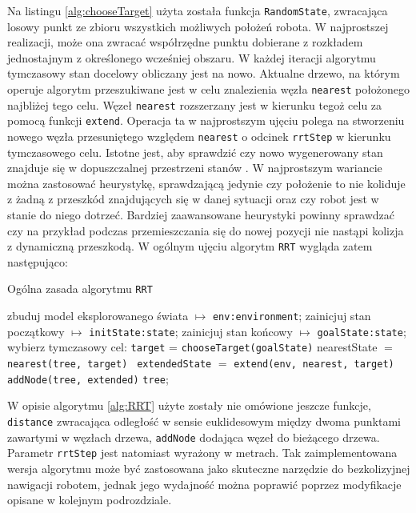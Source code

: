 Na listingu \ref{alg:chooseTarget} użyta została funkcja \texttt{RandomState}, zwracająca losowy punkt ze zbioru wszystkich możliwych położeń robota.
W najprostszej realizacji, może ona zwracać współrzędne punktu dobierane z rozkładem jednostajnym z określonego wcześniej obszaru.
W każdej iteracji algorytmu tymczasowy stan docelowy obliczany jest na nowo. Aktualne drzewo, na którym operuje algorytm przeszukiwane jest w celu znalezienia
węzła \texttt{nearest} położonego najbliżej tego celu. Węzeł \texttt{nearest} rozszerzany jest w kierunku tegoż celu za pomocą funkcji \texttt{extend}.
Operacja ta w najprostszym ujęciu polega na stworzeniu nowego węzła przesuniętego względem \texttt{nearest} o odcinek \texttt{rrtStep} w kierunku tymczasowego celu.
Istotne jest, aby sprawdzić czy nowo wygenerowany stan znajduje się w dopuszczalnej przestrzeni stanów \textdollar. W najprostszym wariancie można zastosować
heurystykę, sprawdzającą jedynie czy położenie to nie koliduje z żadną z przeszkód znajdujących się w danej sytuacji oraz czy robot jest w stanie do niego dotrzeć.
Bardziej zaawansowane heurystyki powinny sprawdzać czy na przykład podczas przemieszczania  się do nowej pozycji nie nastąpi kolizja z dynamiczną przeszkodą.
W ogólnym ujęciu algorytm \texttt{RRT} wygląda zatem następująco:
  \begin{algorithm}[H]
	\caption{ Ogólna zasada algorytmu \texttt{RRT} }
	\label{alg:RRT}
	\begin{algorithmic}
	\STATE zbuduj model eksplorowanego świata $\mapsto$ \texttt{env:environment};
	\STATE zainicjuj stan początkowy $\mapsto$ \texttt{initState:state};
	\STATE zainicjuj stan końcowy $\mapsto$ \texttt{goalState:state};
	\STATE
	  \STATE wybierz tymczasowy cel: \texttt{target} =  \texttt{chooseTarget(goalState)}
	  \STATE nearestState $=$ \texttt{ nearest(tree, target) }
	  \STATE \texttt{extendedState} $=$ \texttt{extend(env, nearest, target)}
	    \STATE \texttt{addNode(tree, extended)}
	  \ENDIF
	\ENDWHILE
	\RETURN  \texttt{tree};
	\end{algorithmic}
  \end{algorithm}
W opisie algorytmu \ref{alg:RRT} użyte zostały nie omówione jeszcze funkcje, \texttt{distance} zwracająca odległość w sensie euklidesowym między dwoma punktami zawartymi w węzłach drzewa,
\texttt{addNode} dodająca węzeł do bieżącego drzewa. Parametr \texttt{rrtStep} jest natomiast wyrażony w metrach.
Tak zaimplementowana wersja algorytmu może być zastosowana jako skuteczne narzędzie do bezkolizyjnej nawigacji robotem, jednak jego wydajność można poprawić poprzez
modyfikacje opisane w kolejnym podrozdziale.

